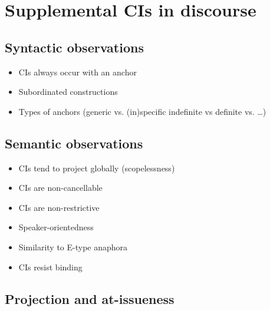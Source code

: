 \section{Supplemental CIs in discourse}

\subsection{Syntactic observations}

\begin{itemize}
  \item CIs always occur with an anchor
  \item Subordinated constructions
  \item Types of anchors (generic vs. (in)specific indefinite vs definite
    vs. \ldots)
\end{itemize}

\citep{delgobbo2003appositives,nouwen2007appositives,
heringa2012appositional,schlenker2013supplements}

\subsection{Semantic observations}

\begin{itemize}
  \item CIs tend to project globally (scopelessness)
  \item CIs are non-cancellable
  \item CIs are non-restrictive
  \item Speaker-orientedness
  \item Similarity to E-type anaphora
  \item CIs resist binding
\end{itemize}

\citep{potts2005logic,amaral2007review,harris2009perspective,nouwen2014note}

\subsection{Projection and at-issueness}

\citet{simons2010projects}

